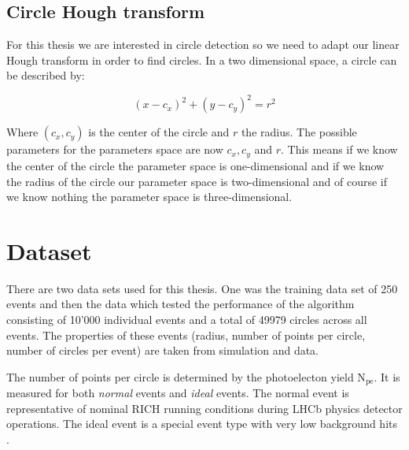 \documentclass[11pt,twoside]{scrreprt}
\begin{document}
\subsection{Circle Hough transform} %
\label{sub:circle_hough_transform}

For this thesis we are interested in circle detection so we need to adapt our linear Hough transform in order to find circles. In a two dimensional space, a circle can be described by:

\begin{equation}
		(x-c_x)^2 + (y-c_y)^2 = r^2
\end{equation}

Where $(c_x,c_y)$ is the center of the circle and $r$ the radius. The possible parameters for the parameters space are now $c_x, c_y$ and $r$. This means if we know the center of the circle the parameter space is one-dimensional and if we know the radius of the circle our parameter space is two-dimensional and of course if we know nothing the parameter space is three-dimensional.




\section{Dataset} %
\label{sec:dataset}
There are two data sets used for this thesis. One was the training data set of 250 events and then the data which tested the performance of the algorithm consisting of 10'000
individual events and a total of 49979 circles across all events. The properties of these events (radius, number of points per circle, number of circles per event) are taken from simulation and data.

The number of points per circle is determined by the photoelecton yield N$_\text{pe}$. It is measured for both \emph{normal} events and \emph{ideal}
events. The normal event is representative of nominal RICH running conditions during LHCb physics detector operations. The ideal event is
a special event type with very low background hits \cite{RICHPerf2012}.
\end{document}
